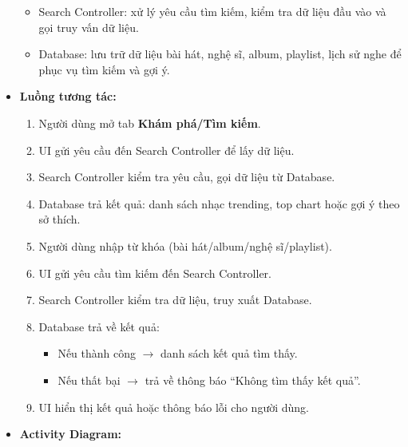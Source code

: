\documentclass[a4paper]{article}
\begin{document}
\begin{itemize}
\begin{itemize}
		      \item Search Controller: xử lý yêu cầu tìm kiếm, kiểm tra dữ liệu đầu vào và gọi truy vấn dữ liệu.
		      \item Database: lưu trữ dữ liệu bài hát, nghệ sĩ, album, playlist, lịch sử nghe để phục vụ tìm kiếm và gợi ý.
	      \end{itemize}
	\item \textbf{Luồng tương tác:}
	      \begin{enumerate}
			\item Người dùng mở tab \textbf{Khám phá/Tìm kiếm}.
			\item UI gửi yêu cầu đến Search Controller để lấy dữ liệu.
			\item Search Controller kiểm tra yêu cầu, gọi dữ liệu từ Database.
			\item Database trả kết quả: danh sách nhạc trending, top chart hoặc gợi ý theo sở thích.
			\item Người dùng nhập từ khóa (bài hát/album/nghệ sĩ/playlist).
			\item UI gửi yêu cầu tìm kiếm đến Search Controller.
			\item Search Controller kiểm tra dữ liệu, truy xuất Database.
			\item Database trả về kết quả:
			\begin{itemize}
				\item Nếu thành công $\rightarrow$ danh sách kết quả tìm thấy.
				\item Nếu thất bại $\rightarrow$ trả về thông báo “Không tìm thấy kết quả”.
			\end{itemize}
			\item UI hiển thị kết quả hoặc thông báo lỗi cho người dùng.
		  \end{enumerate}
	\item \textbf{Activity Diagram:}
		\begin{figure}[H]
				\centering

\end{figure}
\end{itemize}
\end{document}
